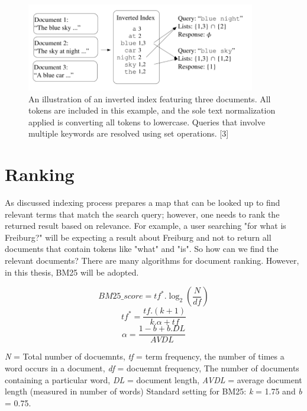 \begin{figure}[h]	
     \centering
     \includegraphics[width=10cm]{images/inverted_index.png}
     \caption{
An illustration of an inverted index featuring three documents. All tokens are included in this example, and the sole text normalization applied is converting all tokens to lowercase. Queries that involve multiple keywords are resolved using set operations. [3]}
     \label{fig:google-arch}
\end{figure}

\section{Ranking}
As discussed indexing process prepares a map that can be looked up to find relevant terms that match the search query; however, one needs to rank the returned result based on relevance. For example, a user searching "for what is Freiburg?" will be expecting a result about Freiburg and not to return all documents that contain tokens like "what" and "is". So how can we find the relevant documents? There are many algorithms for document ranking. However, in this thesis, BM25 will be adopted. 

\begin{equation}
BM25\_score = tf^*.\log_2(\frac{N}{df})
\label{eq:depth}
\end{equation}
\begin{equation}
tf^* = \frac{tf.(k+1)}{k.\alpha+tf}
\label{eq:depth}
\end{equation}
\begin{equation}
\alpha = \frac{1-b+b.DL}{AVDL}
\label{eq:depth}
\end{equation}

\textit{N} = Total number of docuemnts, \textit{tf} = term frequency, the number of times a word occurs in a document, \textit{df} = docuemnt frequency, The number of documents containing a particular word, \textit{DL} = document length, \textit{AVDL} =
average document length (measured in number of words)
Standard setting for BM25: \textit{k} = 1.75 and \textit{b} = 0.75.

